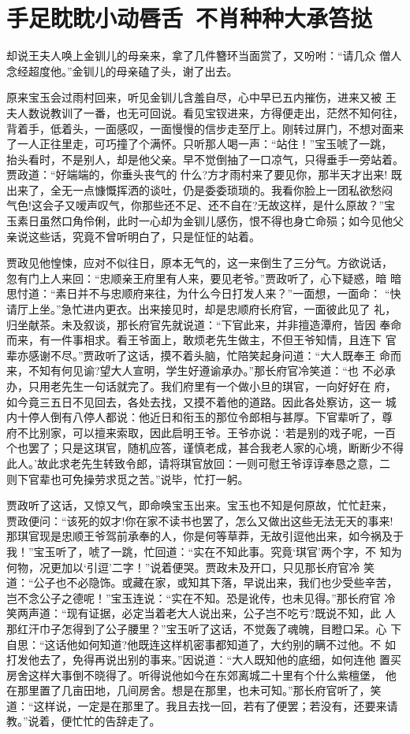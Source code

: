 \chapter{手足眈眈小动唇舌~不肖种种大承笞挞}

却说王夫人唤上金钏儿的母亲来，拿了几件簪环当面赏了，又吩咐：“请几众
僧人念经超度他。”金钏儿的母亲磕了头，谢了出去。

原来宝玉会过雨村回来，听见金钏儿含羞自尽，心中早已五内摧伤，进来又被
王夫人数说教训了一番，也无可回说。看见宝钗进来，方得便走出，茫然不知何往，
背着手，低着头，一面感叹，一面慢慢的信步走至厅上。刚转过屏门，不想对面来
了一人正往里走，可巧撞了个满怀。只听那人喝一声：“站住！”宝玉唬了一跳，
抬头看时，不是别人，却是他父亲。早不觉倒抽了一口凉气，只得垂手一旁站着。
贾政道：“好端端的，你垂头丧气的什么?方才雨村来了要见你，那半天才出来!
既出来了，全无一点慷慨挥洒的谈吐，仍是委委琐琐的。我看你脸上一团私欲愁闷
气色!这会子又嗳声叹气，你那些还不足、还不自在?无故这样，是什么原故？”宝
玉素日虽然口角伶俐，此时一心却为金钏儿感伤，恨不得也身亡命殒；如今见他父
亲说这些话，究竟不曾听明白了，只是怔怔的站着。

贾政见他惶悚，应对不似往日，原本无气的，这一来倒生了三分气。方欲说话，
忽有门上人来回：“忠顺亲王府里有人来，要见老爷。”贾政听了，心下疑惑，暗
暗思忖道：“素日并不与忠顺府来往，为什么今日打发人来？”一面想，一面命：
“快请厅上坐。”急忙进内更衣。出来接见时，却是忠顺府长府官，一面彼此见了
礼，归坐献茶。未及叙谈，那长府官先就说道：“下官此来，并非擅造潭府，皆因
奉命而来，有一件事相求。看王爷面上，敢烦老先生做主，不但王爷知情，且连下
官辈亦感谢不尽。”贾政听了这话，摸不着头脑，忙陪笑起身问道：“大人既奉王
命而来，不知有何见谕?望大人宣明，学生好遵谕承办。”那长府官冷笑道：“也
不必承办，只用老先生一句话就完了。我们府里有一个做小旦的琪官，一向好好在
府，如今竟三五日不见回去，各处去找，又摸不着他的道路。因此各处察访，这一
城内十停人倒有八停人都说：他近日和衔玉的那位令郎相与甚厚。下官辈听了，尊
府不比别家，可以擅来索取，因此启明王爷。王爷亦说：‘若是别的戏子呢，一百
个也罢了；只是这琪官，随机应答，谨慎老成，甚合我老人家的心境，断断少不得
此人。’故此求老先生转致令郎，请将琪官放回：一则可慰王爷谆谆奉恳之意，二
则下官辈也可免操劳求觅之苦。”说毕，忙打一躬。

贾政听了这话，又惊又气，即命唤宝玉出来。宝玉也不知是何原故，忙忙赶来，
贾政便问：“该死的奴才!你在家不读书也罢了，怎么又做出这些无法无天的事来!
那琪官现是忠顺王爷驾前承奉的人，你是何等草莽，无故引逗他出来，如今祸及于
我！”宝玉听了，唬了一跳，忙回道：“实在不知此事。究竟‘琪官’两个字，不
知为何物，况更加以‘引逗’二字！”说着便哭。贾政未及开口，只见那长府官冷
笑道：“公子也不必隐饰。或藏在家，或知其下落，早说出来，我们也少受些辛苦，
岂不念公子之德呢！”宝玉连说：“实在不知。恐是讹传，也未见得。”那长府官
冷笑两声道：“现有证据，必定当着老大人说出来，公子岂不吃亏?既说不知，此
人那红汗巾子怎得到了公子腰里？”宝玉听了这话，不觉轰了魂魄，目瞪口呆。心
下自思：“这话他如何知道?他既连这样机密事都知道了，大约别的瞒不过他。不
如打发他去了，免得再说出别的事来。”因说道：“大人既知他的底细，如何连他
置买房舍这样大事倒不晓得了。听得说他如今在东郊离城二十里有个什么紫檀堡，
他在那里置了几亩田地，几间房舍。想是在那里，也未可知。”那长府官听了，笑
道：“这样说，一定是在那里了。我且去找一回，若有了便罢；若没有，还要来请
教。”说着，便忙忙的告辞走了。

